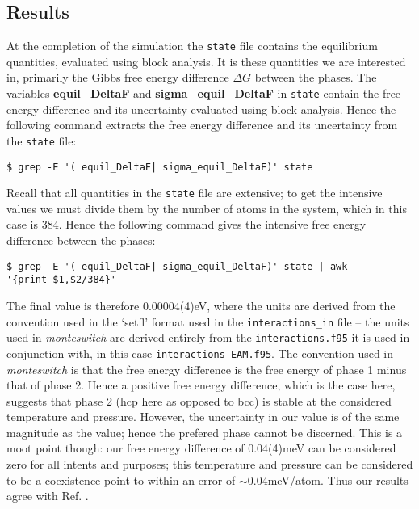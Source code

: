 \documentclass{report}
\begin{document}
\subsection{Results}
At the completion of the simulation the \texttt{state} file contains the equilibrium quantities, evaluated using block analysis. It is these quantities we
are interested in, primarily the Gibbs free energy difference $\Delta G$ between the phases. The variables \textbf{equil\_DeltaF} and 
\textbf{sigma\_equil\_DeltaF} in \texttt{state} contain the free energy difference and its uncertainty evaluated using block analysis.
Hence the following command extracts the free energy difference and its uncertainty from the \texttt{state} file:
\begin{verbatim}
$ grep -E '( equil_DeltaF| sigma_equil_DeltaF)' state
\end{verbatim}
Recall that all quantities in the \texttt{state} file are extensive; to get the intensive values we must divide them by the number of atoms in the system, which
in this case is 384. Hence the following command gives the intensive free energy difference between the phases:
\begin{verbatim}
$ grep -E '( equil_DeltaF| sigma_equil_DeltaF)' state | awk
'{print $1,$2/384}'
\end{verbatim}
The final value is therefore 0.00004(4)eV, where the units are derived from the convention used in the `setfl' format used in the \texttt{interactions\_in}
file -- the units used in \emph{monteswitch} are derived entirely from the \texttt{interactions.f95} it is used in conjunction with, in this case 
\texttt{interactions\_EAM.f95}.
The convention used in \emph{monteswitch} is that the free energy difference is the free energy of phase 1 minus that of phase 2. Hence a positive free energy
difference, which is the case here, suggests that phase 2 (hcp here as opposed to bcc) is stable at the considered temperature and pressure. 
However, the uncertainty in our value is of the same magnitude as the value; hence the prefered phase cannot be discerned. This is a moot point though:
our free energy difference of 0.04(4)meV can be considered zero for all intents and purposes; this temperature and pressure can be considered to be
a coexistence point to within an error of $\sim 0.04$meV/atom. Thus our results agree with Ref. \cite{Mendelev_2007}.
\end{document}
